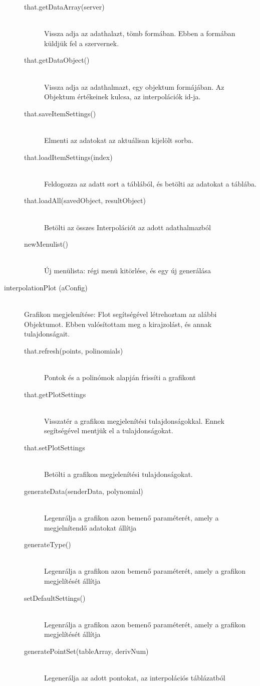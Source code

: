 \begin{description}
\begin{description}
			\item[that.getDataArray(server)] 
			\hfill \\ Vissza adja az adathalazt, tömb formában. Ebben a formában küldjük fel a szervernek.
			\item[that.getDataObject()] 
			\hfill \\ Vissza adja az adathalmazt, egy objektum formájában. Az Objektum értékeinek kulcsa, az interpolációk id-ja.
			\item[that.saveItemSettings()] 
			\hfill \\ Elmenti az adatokat az aktuálisan kijelölt sorba.
			\item[that.loadItemSettings(index)]
			\hfill \\ Feldogozza az adatt sort a táblából, és betölti az adatokat a táblába.
			\item[that.loadAll(savedObject, resultObject)] 
			\hfill \\Betölti az összes Interpolációt az adott adathalmazból
			\item[newMenulist()] 
			\hfill \\
			Új menülista: régi menü kitörlése, és egy új generálása
			\hfill \\ 
			\end{description}
		\item[interpolationPlot (aConfig)]
			\hfill \\ Grafikon megjelenítése: Flot segítségével létrehoztam az alábbi Objektumot. Ebben valósítottam meg a kirajzolást, és annak tulajdonságait.
			\begin{description}
			\item[that.refresh(points, polinomials)]
			\hfill \\ Pontok és a polinómok alapján frissíti a grafikont
			\item[that.getPlotSettings]
			\hfill \\ Visszatér a grafikon megjelenítési tulajdonságokkal. Ennek segítségével mentjük el a tulajdonságokat.
			\item[that.setPlotSettings]
			\hfill \\ Betölti a grafikon megjelenítési tulajdonságokat.
			\item[generateData(senderData, polynomial)]
			\hfill \\ Legenrálja a grafikon azon bemenő paraméterét, amely a megjelnítendő adatokat állítja
			\item[generateType()]
			\hfill \\ Legenrálja a grafikon azon bemenő paraméterét, amely a grafikon megjelítését állítja
			\item[setDefaultSettings()]
			\hfill \\ Legenrálja a grafikon azon bemenő paraméterét, amely a grafikon megjelítését állítja
			\item[generatePointSet(tableArray, derivNum)]
			\hfill \\ Legenerálja az adott pontokat, az interpolációs táblázatból
			\end{description}


\end{description}
